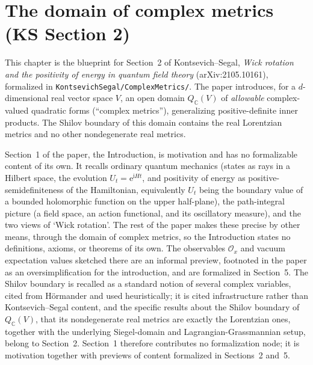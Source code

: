 %

\chapter{The domain of complex metrics (KS Section 2)}

This chapter is the blueprint for Section~2 of Kontsevich--Segal,
\emph{Wick rotation and the positivity of energy in quantum field theory}
(arXiv:2105.10161), formalized in \texttt{KontsevichSegal/ComplexMetrics/}.
The paper introduces, for a $d$-dimensional real vector space $V$, an open
domain $Q_{\mathbb C}(V)$ of \emph{allowable} complex-valued quadratic forms
(``complex metrics''), generalizing positive-definite inner products. The
Shilov boundary of this domain contains the real Lorentzian metrics and no
other nondegenerate real metrics.

Section~1 of the paper, the Introduction, is motivation and has no formalizable
content of its own. It recalls ordinary quantum mechanics (states as rays in a
Hilbert space, the evolution $U_t = \mathrm e^{\mathrm i H t}$, and positivity of
energy as positive-semidefiniteness of the Hamiltonian, equivalently $U_t$ being the
boundary value of a bounded holomorphic function on the upper half-plane), the
path-integral picture (a field space, an action functional, and its oscillatory
measure), and the two views of `Wick rotation'. The rest of the paper makes these
precise by other means, through the domain of complex metrics, so the Introduction
states no definitions, axioms, or theorems of its own. The observables
$\mathcal O_x$ and vacuum expectation values sketched there are an informal preview,
footnoted in the paper as an oversimplification for the introduction, and are
formalized in Section~5. The Shilov boundary is recalled as a standard notion of
several complex variables, cited from Hörmander and used heuristically; it is cited
infrastructure rather than Kontsevich--Segal content, and the specific results about
the Shilov boundary of $Q_{\mathbb C}(V)$, that its nondegenerate real metrics are
exactly the Lorentzian ones, together with the underlying Siegel-domain and
Lagrangian-Grassmannian setup, belong to Section~2. Section~1 therefore contributes
no formalization node; it is motivation together with previews of content formalized
in Sections~2 and~5.

